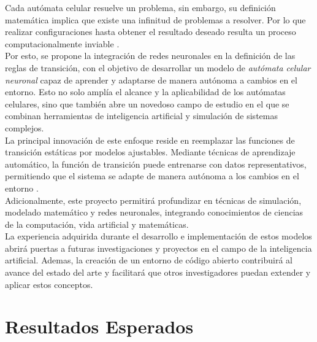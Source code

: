 \documentclass[letterpaper,10pt,oneside]{article}
\begin{document}
	Cada autómata celular resuelve un problema, sin embargo, su definición matemática implica que existe una infinitud de problemas a resolver. Por lo que realizar configuraciones hasta obtener el resultado deseado resulta un proceso computacionalmente inviable \cite{elYacoubi2021control}. \\
	
	Por esto, se propone la integración de redes neuronales en la definición de las reglas de transición, con el objetivo de desarrollar un modelo de \textit{autómata celular neuronal} capaz de aprender y adaptarse de manera autónoma a cambios en el entorno. Esto no solo amplía el alcance y la aplicabilidad de los autómatas celulares, sino que también abre un novedoso campo de estudio en el que se combinan herramientas de inteligencia artificial y simulación de sistemas complejos. \\
	
	La principal innovación de este enfoque reside en reemplazar las funciones de transición estáticas por modelos ajustables. Mediante técnicas de aprendizaje automático, la función de transición puede entrenarse con datos representativos, permitiendo que el sistema se adapte de manera autónoma a los cambios en el entorno \cite{pre}. \\
	
	Adicionalmente, este proyecto permitirá profundizar en técnicas de simulación, modelado matemático y redes neuronales, integrando conocimientos de ciencias de la computación, vida artificial y matemáticas. \\
	
	La experiencia adquirida durante el desarrollo e implementación de estos modelos abrirá puertas a futuras investigaciones y proyectos en el campo de la inteligencia artificial. Ademas, la creación de un entorno de código abierto contribuirá al avance del estado del arte y facilitará que otros investigadores puedan extender y aplicar estos conceptos.
	
	\section{Resultados Esperados}
	
\end{document}
